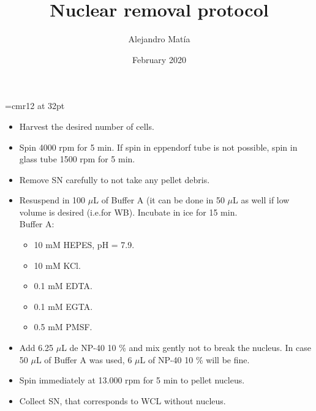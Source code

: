 \documentclass{article}
\author{Alejandro Matía}
\date{February 2020}
\begin{document}
\font\myfont=cmr12 at 32pt
\title{{\myfont Nuclear removal protocol}}

\maketitle

\begin{itemize}
    \item Harvest the desired number of cells.
    \item Spin 4000 rpm for 5 min. If spin in eppendorf tube is not possible, spin in glass tube 1500 rpm for 5 min.
    \item Remove SN carefully to not take any pellet debris.
    \item Resuspend in 100 $\mu$L of Buffer A (it can be done in 50 $\mu$L as well if low volume is desired (i.e.for WB). Incubate in ice for 15 min.
    \\
    Buffer A:
    \begin{itemize}
        \item 10 mM HEPES, pH = 7.9.
        \item 10 mM KCl.
        \item 0.1 mM EDTA.
        \item 0.1 mM EGTA.
        \item 0.5 mM PMSF.
    \end{itemize}
    \item Add 6.25 $\mu$L de NP-40 10 \% and mix gently not to break the nucleus. In case 50 $\mu$L of Buffer A was used, 6 $\mu$L of NP-40 10 \% will be fine.
    \item Spin immediately at 13.000 rpm for 5 min to pellet nucleus.
    \item Collect SN, that corresponds to WCL without nucleus.
\end{itemize}
\end{document}
